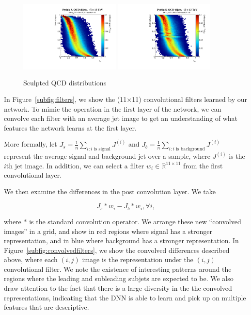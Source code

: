 \begin{figure}[bt]
\begin{center}
{        \includegraphics[width=0.45\textwidth]{figures/tau21_convnet_back_norm_invert.pdf} \includegraphics[width=0.45\textwidth]{figures/tau21_maxout_back_norm_invert.pdf}
      }

      \caption{Sculpted QCD distributions}
      \label{fig:qcdsculpt}

    \end{center}
\end{figure}


In Figure~\ref{subfig:filters}, we show the (11$\times$11) convolutional filters learned by our network. To mimic the operation in the first layer of the network, we can convolve each filter with an average jet image to get an understanding of what features the network learns at the first layer. 

More formally, let $J_s=\frac{1}{n}\sum_{i:i\text{ is signal}} J^{(i)}$ and $J_b=\frac{1}{n}\sum_{i:i\text{ is background}}J^{(i)}$ represent the average signal and background jet over a sample, where $J^{(i)}$ is the $i$th jet image. In addition, we can select a filter $w_i\in\mathbb{R}^{11\times11}$ from the first convolutional layer.

We then examine the differences in the post convolution layer. We take 

\begin{equation}
  J_s \ast w_i - J_b \ast w_i, \forall i,
\end{equation}

where $\ast$ is the standard convolution operator. We arrange these new ``convolved images'' in a grid, and show in red regions where signal has a stronger representation, and in blue where background has a stronger representation. In Figure~\ref{subfig:convolvedfilters}, we show the convolved differences described above, where each $(i, j)$ image is the representation under the $(i, j)$ convolutional filter. We note the existence of interesting patterns around the regions where the leading and subleading subjets are expected to be. We also draw attention to the fact that there is a large diversity in the the convolved representations, indicating that the DNN is able to learn and pick up on multiple features that are descriptive.



